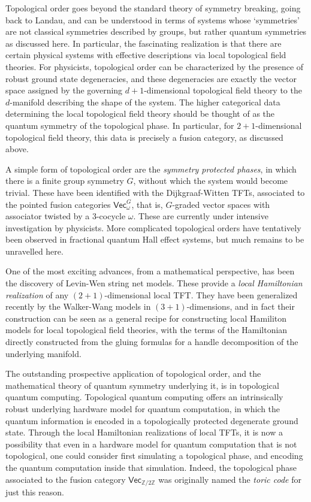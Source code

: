 \documentclass[12pt]{article}
\begin{document}
Topological order goes beyond the standard theory of symmetry breaking, going
back to Landau, and can be understood in terms of systems whose `symmetries'
are not classical symmetries described by groups, but rather quantum
symmetries as discussed here. In particular, the fascinating realization is
that there are certain physical systems with effective descriptions via local
topological field theories. For physicists, topological order can be
characterized by the presence of robust ground state degeneracies, and these
degeneracies are exactly the vector space assigned by the governing
$d+1$-dimensional topological field theory to the $d$-manifold describing the
shape of the system. The higher categorical data determining the local
topological field theory should be thought of as the quantum symmetry of the
topological phase. In particular, for $2+1$-dimensional topological field
theory, this data is precisely a fusion category, as discussed above.

A simple form of topological order are the \emph{symmetry protected phases}, in which there is a finite group symmetry $G$, without which the system would become trivial. These have been identified with the Dijkgraaf-Witten TFTs, associated to the pointed fusion categories $\mathsf{Vec}_\omega^G$, that is, $G$-graded vector spaces with associator twisted by a 3-cocycle $\omega$. These are currently under intensive investigation by physicists. More complicated topological orders have tentatively been observed in fractional quantum Hall effect systems, but much remains to be unravelled here.

One of the most exciting advances, from a mathematical perspective, has been the discovery of Levin-Wen string net models. These provide a \emph{local Hamiltonian realization} of any $(2+1)$-dimensional local TFT. They have been generalized recently by the Walker-Wang models in $(3+1)$-dimensions, and in fact their construction can be seen as a general recipe for constructing local Hamiliton models for local topological field theories, with the terms of the Hamiltonian directly constructed from the gluing formulas for a handle decomposition of the underlying manifold.

The outstanding prospective application of topological order, and the mathematical theory of quantum symmetry underlying it, is in topological quantum computing. Topological quantum computing offers an intrinsically robust underlying hardware model for quantum computation, in which the quantum information is encoded in a topologically protected degenerate ground state. Through the local Hamiltonian realizations of local TFTs, it is now a possibility that even in a hardware model for quantum computation that is not topological, one could consider first simulating a topological phase, and encoding the quantum computation inside that simulation. Indeed, the topological phase associated to the fusion category $\textsf{Vec}_{\mathbb Z / 2 \mathbb Z}$ was originally named the \emph{toric code} for just this reason.
\end{document}
